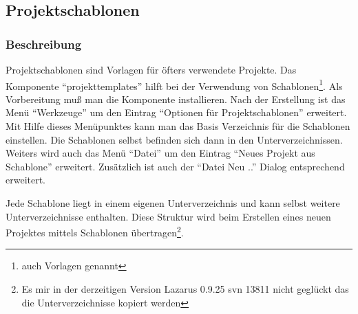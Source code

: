 \subsection[Projektschablonen]{Projektschablonen}
\subsubsection{Beschreibung}
Projektschablonen sind Vorlagen für öfters verwendete Projekte. Das Komponente "`projekttemplates"' hilft bei der Verwendung von Schablonen\footnote{auch Vorlagen genannt}. Als Vorbereitung muß man die Komponente installieren. 
\label{fig:ProjectTempl01}Nach der Erstellung ist das Menü "`Werkzeuge"' um den Eintrag "`Optionen für Projektschablonen"' erweitert. Mit Hilfe dieses Menüpunktes kann man das Basis Verzeichnis für die Schablonen einstellen. \label{fig:ProjectTempl02}Die Schablonen selbst befinden sich dann in den Unterverzeichnissen. Weiters wird auch das Menü "`Datei"' um den Eintrag "`Neues Projekt aus Schablone"' erweitert. Zusätzlich ist auch der "`Datei Neu .."' Dialog entsprechend erweitert.

Jede Schablone liegt in einem eigenen Unterverzeichnis und kann selbst weitere Unterverzeichnisse enthalten. Diese Struktur wird beim Erstellen eines neuen Projektes mittels Schablonen übertragen\footnote{Es mir in der derzeitigen Version Lazarus 0.9.25 svn 13811 nicht geglückt das die Unterverzeichnisse kopiert werden}.

